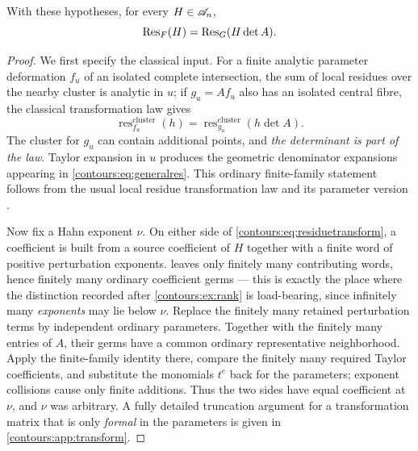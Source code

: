 \documentclass[11pt,letterpaper]{article}
\theoremstyle{definition}
\theoremstyle{remark}
\newcommand{\res}{\operatorname{res}}\newcommand{\wind}{\operatorname{wind}}
\numberwithin{equation}{section}
\begin{document}
\begin{lemma}
\label{contours:lem:residuetransform}
With these hypotheses, for every $H\in\mathscr A_n$,
\begin{equation}\label{contours:eq:residuetransform}
  \operatorname{Res}_F(H)=\operatorname{Res}_G(H\det A).
\end{equation}
\end{lemma}
\begin{proof}
We first specify the classical input. For a finite analytic parameter deformation
$f_u$ of an isolated complete intersection, the sum of local residues over the
nearby cluster is analytic in $u$; if $g_u=Af_u$ also has an isolated central
fibre, the classical transformation law gives
\[
  \res^{\mathrm{cluster}}_{f_u}(h)=\res^{\mathrm{cluster}}_{g_u}(h\det A).
\]
The cluster for $g_u$ can contain additional points, and \emph{the determinant is
part of the law}. Taylor expansion in $u$ produces the geometric denominator
expansions appearing in \eqref{contours:eq:generalres}. This ordinary finite-family
statement follows from the usual local residue transformation law and its parameter
version \cite{Tsikh,CDS}.

Now fix a Hahn exponent $\nu$. On either side of
\eqref{contours:eq:residuetransform}, a coefficient is built from a source
coefficient of $H$ together with a finite word of positive perturbation exponents.
 leaves only finitely many contributing words, hence
finitely many ordinary coefficient germs --- this is exactly the place where the
distinction recorded after \cref{contours:ex:rank} is load-bearing, since
infinitely many \emph{exponents} may lie below $\nu$. Replace the finitely many
retained perturbation terms by independent ordinary parameters. Together with the
finitely many entries of $A$, their germs have a common ordinary representative
neighborhood. Apply the finite-family identity there, compare the finitely many
required Taylor coefficients, and substitute the monomials $t^e$ back for the
parameters; exponent collisions cause only finite additions. Thus the two sides have
equal coefficient at $\nu$, and $\nu$ was arbitrary. A fully detailed truncation
argument for a transformation matrix that is only \emph{formal} in the parameters is
given in \cref{contours:app:transform}.
\end{proof}
\end{document}
